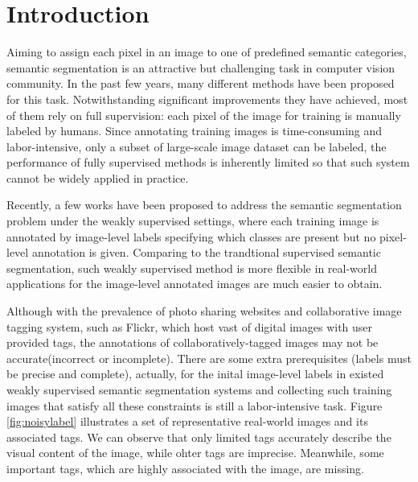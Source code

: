 \section{Introduction}
Aiming to assign each pixel in an image to one of predefined semantic categories, semantic segmentation is an attractive but challenging task in computer vision community. In the past few years, many different methods \cite{csurka2011efficient,gonfaus2010harmony,ladicky2009associative,nowozin2010parameter,shotton2008semantic,shotton2006textonboost,singh2013nonparametric,verbeek2007scene,yang2007multiple,yao2012describing} have been proposed for this task. Notwithstanding significant improvements they have achieved, most of them rely on full supervision: each pixel of the image for training is manually labeled by humans. Since annotating training images is time-consuming and labor-intensive, only a subset of large-scale image dataset can be labeled, the performance of fully supervised methods is inherently limited so that such system cannot be widely applied in practice.

Recently, a few works have been proposed to address the semantic segmentation problem under the weakly supervised settings, where each training image is annotated by image-level labels specifying which classes are present but no pixel-level annotation is given\cite{verbeek2007region,vezhnevets2010towards,vezhnevets2011weakly,vezhnevets2012weakly,xu2014tell,zhang2013sparse}. Comparing to the trandtional supervised semantic segmentation, such weakly supervised method is more flexible in real-world applications for the image-level annotated images are much easier to obtain.

Although with the prevalence of photo sharing websites and collaborative image tagging system, such as Flickr, which host vast of digital images with user provided tags, the annotations of collaboratively-tagged images may not be accurate(incorrect or incomplete). There are some extra prerequisites (\eg labels must be precise and complete), actually, for the inital image-level labels in existed weakly supervised semantic segmentation systems and collecting such training images that satisfy all these constraints is still a labor-intensive task. Figure \ref{fig:noisylabel} illustrates a set of representative real-world images and its associated tags. We can observe that only limited tags accurately describe the visual content of the image, while ohter tags are imprecise. Meanwhile, some important tags, which are highly associated with the image, are missing.

